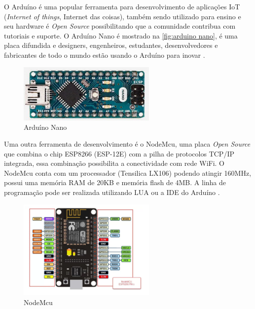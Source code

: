     \par
    O Arduíno é uma popular ferramenta para desenvolvimento de aplicações IoT (\textit{Internet of things}, Internet das coisas), também sendo utilizado para ensino e seu hardware é \textit{Open Source} possibilitando que a comunidade contribua com tutoriais e suporte. O Arduíno Nano é mostrado na \autoref{fig:arduino nano}, é uma placa difundida e designers, engenheiros, estudantes, desenvolvedores e fabricantes de todo o mundo estão usando o Arduíno para inovar \cite{arduino}.
     \begin{figure}[h!]
              \caption{\label{fig:arduino nano}{Arduíno Nano}}
              \centering
              \includegraphics[width=0.6\textwidth]{Figuras/arduino_nano.png}
    \end{figure}
    \par
    Uma outra ferramenta de desenvolvimento é o NodeMcu, uma placa \textit{Open Source} que combina o chip ESP8266 (ESP-12E) com a pilha de protocolos TCP/IP integrada, essa combinação possibilita a conectividade com rede WiFi. O NodeMcu conta com um processador (Tensilica LX106) podendo atingir 160MHz, possui uma memória RAM de 20KB e memória flash de 4MB. A linha de programação pode ser realizada utilizando LUA ou a IDE do Arduíno \cite{nodemcu}.
    \par
     \begin{figure}[h!]
              \caption{\label{fig:arduino nano}{NodeMcu}}
              \centering
              \includegraphics[width=0.6\textwidth]{Figuras/esp8266-nodemcu.png}
    \end{figure}
